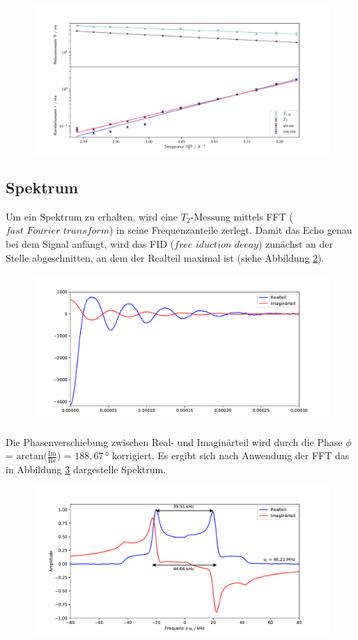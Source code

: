 \begin{figure}[H]
    \centering
    \includegraphics[width=\textwidth]{Auswertung/Tempabh/Korr_Temp.pdf}
    \caption{}
    \label{fig:tempabh}
\end{figure}

\subsection{Spektrum}
\label{sec:spek}
Um ein Spektrum zu erhalten, wird eine $T_2$-Messung mittels FFT
($\textit{fast Fourier transform}$) in seine Frequenzanteile zerlegt.
Damit das Echo genau bei dem Signal anfängt, wird das FID
($\textit{free iduction decay}$) zunächst an der Stelle abgeschnitten, an dem der
Realteil maximal ist (siehe Abbildung \ref{fig:fid}).

\begin{figure}[H]
    \centering
    \includegraphics[width=\textwidth]{Auswertung/Spek/FID.pdf}
    \caption{}
    \label{fig:fid}
\end{figure}
\noindent
Die Phasenverschiebung zwischen Real- und Imaginärteil wird durch die Phase $\phi$ =
$\text{arctan}\biggl(\frac{\text{Im}}{\text{Re}}\biggr)$ = $188,67\,°$ korrigiert.
Es ergibt sich nach Anwendung der FFT das in Abbildung \ref{fig:spek} dargestelle
Spektrum.

\begin{figure}[H]
    \centering
    \includegraphics[width=\textwidth]{Auswertung/Spek/Spek.pdf}
    \caption{}
    \label{fig:spek}
\end{figure}
